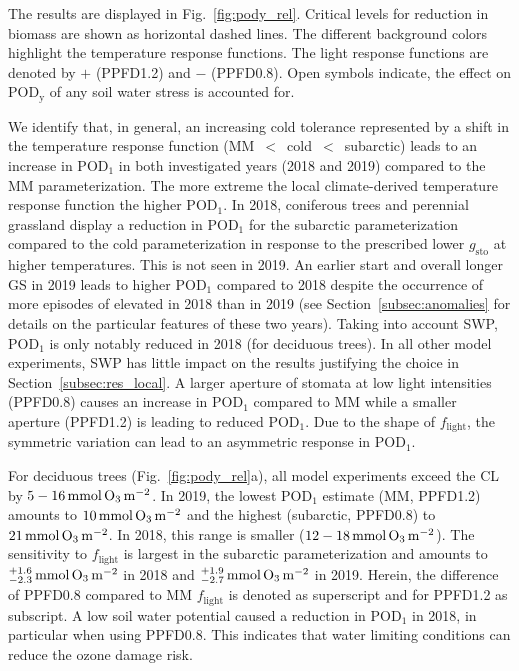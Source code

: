 \documentclass[bg, manuscript]{copernicus}
\begin{document}
The results are displayed in Fig.~\ref{fig:pody_rel}. Critical levels for reduction in biomass \citep[deciduous forest $4\,\unit{\%}$, coniferous forest $2\,\unit{\%}$, and grasslands $10\,\unit{\%}$ adopted from][]{ICP:MappingManual2017,ESPR:Hayes2021} are shown as horizontal dashed lines. The different background colors highlight the temperature response functions. The light response functions are denoted by $+$ (PPFD1.2) and $-$ (PPFD0.8). Open symbols indicate, the effect on $\mathrm{POD_y}$ of any soil water stress is accounted for.

We identify that, in general, an increasing cold tolerance represented by a shift in the temperature response function (MM~$<$~cold~$<$~subarctic) leads to an increase in $\mathrm{POD_1}$ in both investigated years (2018 and 2019) compared to the MM parameterization. The more extreme the local climate-derived temperature response function the higher $\mathrm{POD_1}$. In 2018, coniferous trees and perennial grassland display a reduction in $\mathrm{POD_1}$ for the subarctic parameterization compared to the cold parameterization in response to the prescribed lower $g_\mathrm{sto}$ at higher temperatures. This is not seen in 2019. An earlier start and overall longer GS in 2019 leads to higher $\mathrm{POD_1}$ compared to 2018 despite the occurrence of more episodes of elevated  in 2018 than in 2019 (see Section~\ref{subsec:anomalies} for details on the particular features of these two years). Taking into account SWP, $\mathrm{POD_1}$ is only notably reduced in 2018 (for deciduous trees). In all other model experiments, SWP has little impact on the results justifying the choice in Section~\ref{subsec:res_local}. A larger aperture of stomata at low light intensities (PPFD0.8) causes an increase in $\mathrm{POD_1}$ compared to MM while a smaller aperture (PPFD1.2) is leading to reduced $\mathrm{POD_1}$. Due to the shape of $f_\mathrm{light}$, the symmetric variation can lead to an asymmetric response in $\mathrm{POD_1}$.

For deciduous trees (Fig.~\ref{fig:pody_rel}a), all model experiments exceed the CL by $5-16\,\unit{mmol\,\chem{O_3}\,m^{-2}}$. In 2019, the lowest $\mathrm{POD_1}$ estimate (MM, PPFD1.2) amounts to $10\,\unit{mmol\,\chem{O_3}\,m^{-2}}$ and the highest (subarctic, PPFD0.8) to $21\,\unit{mmol\,\chem{O_3}\,m^{-2}}$. In 2018, this range is smaller ($12-18\,\unit{mmol\,\chem{O_3}\,m^{-2}}$). The sensitivity to $f_\mathrm{light}$ is largest in the subarctic parameterization and amounts to $^{+1.6}_{-2.3}\,\unit{mmol\,\chem{O_3}\,m^{-2}}$ in 2018 and $^{+1.9}_{-2.7}\,\unit{mmol\,\chem{O_3}\,m^{-2}}$ in 2019. Herein, the difference of PPFD0.8 compared to MM $f_\mathrm{light}$ is denoted as superscript and for PPFD1.2 as subscript. A low soil water potential caused a reduction in $\mathrm{POD_1}$ in 2018, in particular when using PPFD0.8. This indicates that water limiting conditions can reduce the ozone damage risk.
\end{document}
